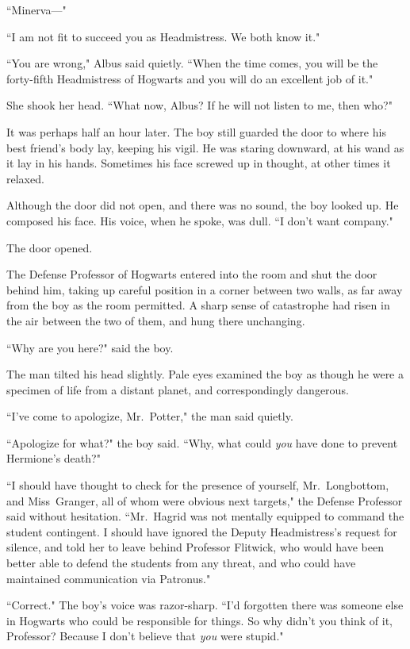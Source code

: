 ``Minerva—"

``I am not fit to succeed you as Headmistress. We both know it."

``You are wrong," Albus said quietly. ``When the time comes, you will be the forty-fifth Headmistress of Hogwarts and you will do an excellent job of it."

She shook her head. ``What now, Albus? If he will not listen to me, then who?"

\later

It was perhaps half an hour later. The boy still guarded the door to where his best friend's body lay, keeping his vigil. He was staring downward, at his wand as it lay in his hands. Sometimes his face screwed up in thought, at other times it relaxed.

Although the door did not open, and there was no sound, the boy looked up. He composed his face. His voice, when he spoke, was dull. ``I don't want company."

The door opened.

The Defense Professor of Hogwarts entered into the room and shut the door behind him, taking up careful position in a corner between two walls, as far away from the boy as the room permitted. A sharp sense of catastrophe had risen in the air between the two of them, and hung there unchanging.

``Why are you here?" said the boy.

The man tilted his head slightly. Pale eyes examined the boy as though he were a specimen of life from a distant planet, and correspondingly dangerous.

``I've come to apologize, Mr.~Potter," the man said quietly.

``Apologize for what?" the boy said. ``Why, what could \emph{you} have done to prevent Hermione's death?"

``I should have thought to check for the presence of yourself, Mr.~Longbottom, and Miss~Granger, all of whom were obvious next targets," the Defense Professor said without hesitation. ``Mr.~Hagrid was not mentally equipped to command the student contingent. I should have ignored the Deputy Headmistress's request for silence, and told her to leave behind Professor Flitwick, who would have been better able to defend the students from any threat, and who could have maintained communication via Patronus."

``Correct." The boy's voice was razor-sharp. ``I'd forgotten there was someone else in Hogwarts who could be responsible for things. So why didn't you think of it, Professor? Because I don't believe that \emph{you} were stupid."

